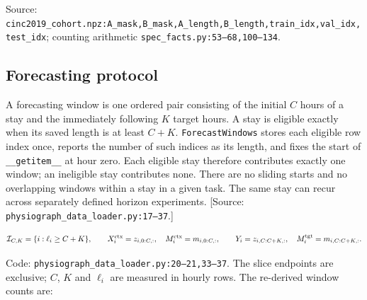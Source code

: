 Source: \texttt{cinc2019\_\allowbreak{}cohort.\allowbreak{}npz:\allowbreak{}A\_\allowbreak{}mask,\allowbreak{}B\_\allowbreak{}mask,\allowbreak{}A\_\allowbreak{}length,\allowbreak{}B\_\allowbreak{}length,\allowbreak{}train\_\allowbreak{}idx,\allowbreak{}val\_\allowbreak{}idx,\allowbreak{}test\_\allowbreak{}idx}; counting arithmetic \texttt{spec\_\allowbreak{}facts.\allowbreak{}py:\allowbreak{}53–\allowbreak{}68,\allowbreak{}100–\allowbreak{}134}.

\subsection{Forecasting protocol}


A forecasting window is one ordered pair consisting of the initial \(C\) hours of a stay and the immediately following \(K\) target hours. A stay is eligible exactly when its saved length is at least \(C+K\). \texttt{ForecastWindows} stores each eligible row index once, reports the number of such indices as its length, and fixes the start of \texttt{\_\allowbreak{}\_\allowbreak{}getitem\_\allowbreak{}\_\allowbreak{}} at hour zero. Each eligible stay therefore contributes exactly one window; an ineligible stay contributes none. There are no sliding starts and no overlapping windows within a stay in a given task. The same stay can recur across separately defined horizon experiments. [Source: \texttt{physiograph\_\allowbreak{}data\_\allowbreak{}loader.\allowbreak{}py:\allowbreak{}17–\allowbreak{}37}.]

\[
\mathcal I_{C,K}=\{i:\ell_i\ge C+K\},\qquad
X_i^{\rm ctx}=z_{i,0:C,:},\quad M_i^{\rm ctx}=m_{i,0:C,:},\qquad
Y_i=z_{i,C:C+K,:},\quad M_i^{\rm tgt}=m_{i,C:C+K,:}.
\]


Code: \texttt{physiograph\_\allowbreak{}data\_\allowbreak{}loader.\allowbreak{}py:\allowbreak{}20–\allowbreak{}21,\allowbreak{}33–\allowbreak{}37}. The slice endpoints are exclusive; \(C\), \(K\) and \(\ell_i\) are measured in hourly rows. The re-derived window counts are:

\begin{center}
\small
{}
\ifdim\wd0>\textwidth\resizebox{\textwidth}{!}{\usebox0}\else\usebox0\fi
\end{center}


